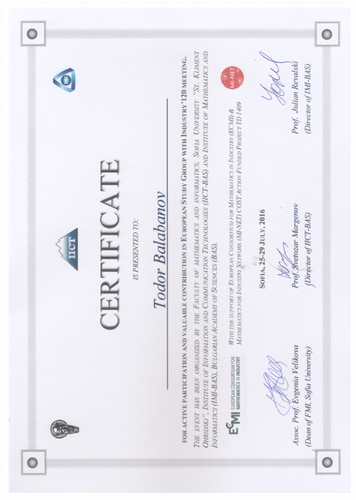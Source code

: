 \documentclass[bulgarian,a4paper]{europasscv}
\begin{document}
\includegraphics[width=\textwidth,height=\textheight,keepaspectratio]{ESGI1202016}
\end{document}
